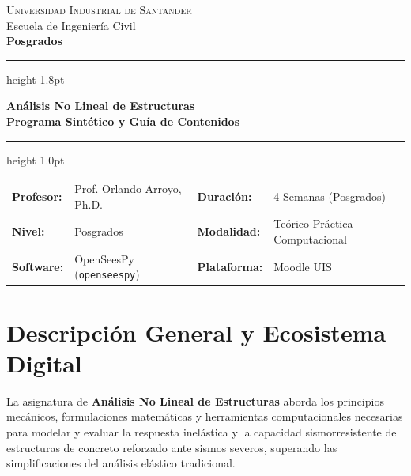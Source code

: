 \documentclass[11pt,letterpaper]{article}
\begin{document}
\enlargethispage{1.5\baselineskip}

\begin{center}
    {\scshape\Large Universidad Industrial de Santander}\\[0.05cm]
    {\large Escuela de Ingeniería Civil}\\[0.04cm]
    {\normalsize\bfseries Posgrados}\\[0.12cm]
    {\color{uispurple}\hrule height 1.8pt}\vspace{0.12cm}
    
    {\huge\bfseries\color{uisdark} Análisis No Lineal de Estructuras}\\[0.08cm]
    {\large\bfseries\color{uispurple} Programa Sintético y Guía de Contenidos}\\[0.12cm]
    
    {\color{uispurple}\hrule height 1.0pt}\vspace{0.14cm}
    
    \small
    \begin{tabularx}{\textwidth}{@{} l X l X @{}}
        \textbf{Profesor:} & Prof. Orlando Arroyo, Ph.D. & \textbf{Duración:} & 4 Semanas (Posgrados) \\
        \textbf{Nivel:} & Posgrados & \textbf{Modalidad:} & Teórico-Práctica Computacional \\
        \textbf{Software:} & OpenSeesPy (\texttt{openseespy}) & \textbf{Plataforma:} & Moodle UIS
    \end{tabularx}
\end{center}

\vspace{0.02cm}

\section{Descripción General y Ecosistema Digital}

La asignatura de \textbf{Análisis No Lineal de Estructuras} aborda los principios mecánicos, formulaciones matemáticas y herramientas computacionales necesarias para modelar y evaluar la respuesta inelástica y la capacidad sismorresistente de estructuras de concreto reforzado ante sismos severos, superando las simplificaciones del análisis elástico tradicional.
\end{document}
